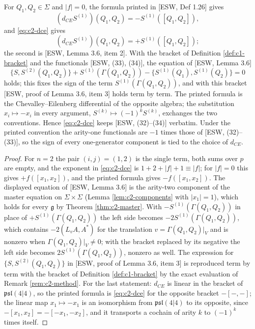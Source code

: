\begin{lemma}
\label{lem:c2-dcesign}
For $Q_1,Q_2\in\Sigma$ and $|f|=0$, the formula printed in [ESW, Def 1.26] gives
\[
(d_{CE}S^{(1)})(Q_1,Q_2)=-S^{(1)}([Q_1,Q_2]),
\]
and \eqref{eq:c2-dce} gives
\[
(d_{CE}S^{(1)})(Q_1,Q_2)=+S^{(1)}([Q_1,Q_2]);
\]
the second is [ESW, Lemma 3.6, item 2]. With the bracket of Definition \ref{def:c1-bracket} and the functionals [ESW, (33), (34)], the equation of [ESW, Lemma 3.6]
\[
\{S,S^{(2)}(Q_1,Q_2)\}+S^{(1)}(\Gamma(Q_1,Q_2))-\{S^{(1)}(Q_1),S^{(1)}(Q_2)\}=0
\]
holds; this fixes the sign of the term $S^{(1)}(\Gamma(Q_1,Q_2))$, and with this bracket [ESW, proof of Lemma 3.6, item 3] holds term by term. The printed formula is the Chevalley--Eilenberg differential of the opposite algebra; the substitution $x_i\mapsto-x_i$ in every argument, $S^{(k)}\mapsto(-1)^kS^{(k)}$, exchanges the two conventions. Hence \eqref{eq:c2-dce} keeps [ESW, (32)--(34)] verbatim. Under the printed convention the arity-one functionals are $-1$ times those of [ESW, (32)--(33)], so the sign of every one-generator component is tied to the choice of $d_{CE}$.
\end{lemma}

\begin{proof}
For $n=2$ the pair $(i,j)=(1,2)$ is the single term, both sums over $p$ are empty, and the exponent in \eqref{eq:c2-dce} is $1+2+|f|+1\equiv|f|$; for $|f|=0$ this gives $+f([x_1,x_2])$, and the printed formula gives $-f([x_1,x_2])$. The displayed equation of [ESW, Lemma 3.6] is the arity-two component of the master equation on $\Sigma\times\Sigma$ (Lemma \ref{lem:c2-components} with $|x_1|=1$), which holds for every $\mathfrak g$ by Theorem \ref{thm:c2-master}. With $-S^{(1)}(\Gamma(Q_1,Q_2))$ in place of $+S^{(1)}(\Gamma(Q_1,Q_2))$ the left side becomes $-2S^{(1)}(\Gamma(Q_1,Q_2))$, which contains $-2(L_vA,A^*)$ for the translation $v=\Gamma(Q_1,Q_2)|_V$ and is nonzero when $\Gamma(Q_1,Q_2)|_V\neq0$; with the bracket replaced by its negative the left side becomes $2S^{(1)}(\Gamma(Q_1,Q_2))$, nonzero as well. The expression for $\{S,S^{(2)}(Q_1,Q_2)\}$ in [ESW, proof of Lemma 3.6, item 3] is reproduced term by term with the bracket of Definition \ref{def:c1-bracket} by the exact evaluation of Remark \ref{rem:c2-method}. For the last statement: $d_{CE}$ is linear in the bracket of $\mathfrak{psl}(4|4)$, so the printed formula is \eqref{eq:c2-dce} for the opposite bracket $-[-,-]$; the linear map $x_1\mapsto-x_1$ is an isomorphism from $\mathfrak{psl}(4|4)$ to its opposite, since $-[x_1,x_2]=-[-x_1,-x_2]$, and it transports a cochain of arity $k$ to $(-1)^k$ times itself.
\end{proof}

